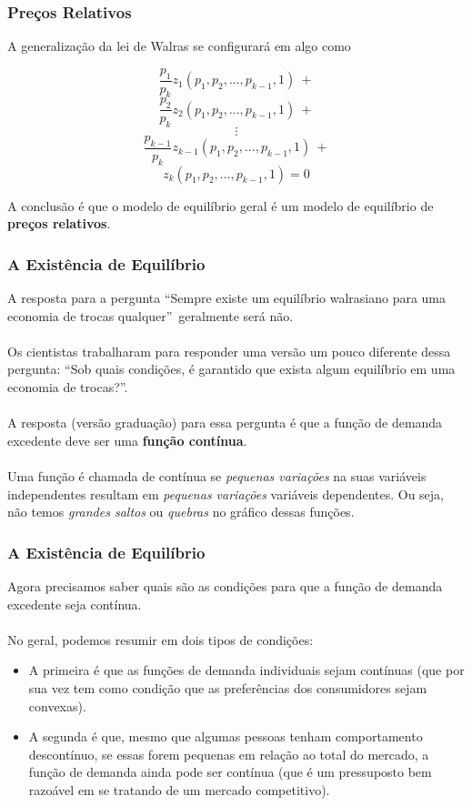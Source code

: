 \documentclass{beamer}[10]
\begin{document}
\begin{frame}
	\frametitle{Preços Relativos}

	A generalização da lei de Walras se configurará em algo como

	$$\frac{p_1}{p_k}z_1(p_1,p_2,...,p_{k-1},1) \ + $$
	$$\frac{p_2}{p_k}z_2(p_1,p_2,...,p_{k-1},1) \ + $$ 
	$$ \vdots $$
	$$\frac{p_{k-1}}{p_k}z_{k - 1}(p_1,p_2,...,p_{k-1},1) \ + $$
	$$z_{k}(p_1,p_2,...,p_{k-1},1) = 0$$
		
	A conclusão é que o modelo de equilíbrio geral é um modelo de equilíbrio de \textbf{preços relativos}.
\end{frame}

\begin{frame}
	\frametitle{A Existência de Equilíbrio}

	A resposta para a pergunta ``Sempre existe um equilíbrio walrasiano para uma economia de trocas qualquer''\ geralmente será não. 
	\\~\\
	Os cientistas trabalharam para responder uma versão um pouco diferente dessa pergunta: ``Sob quais condições, é garantido que exista algum equilíbrio em uma economia de trocas?''.
	\\~\\
	A resposta (versão graduação) para essa pergunta é que a função de demanda excedente deve ser uma \textbf{função contínua}.
	\\~\\
	Uma função é chamada de contínua se \textit{pequenas variações} na suas variáveis independentes resultam em \textit{pequenas variações} variáveis dependentes. Ou seja, não temos \textit{grandes saltos} ou \textit{quebras} no gráfico dessas funções.

\end{frame}

\begin{frame}
	\frametitle{A Existência de Equilíbrio}

	Agora precisamos saber quais são as condições para que a função de demanda excedente seja contínua.
	\\~\\
	No geral, podemos resumir em dois tipos de condições:

	\begin{itemize}
		\item A primeira é que as funções de demanda individuais sejam contínuas (que por sua vez tem como condição que as preferências dos consumidores sejam convexas).
		\item A segunda é que, mesmo que algumas pessoas tenham comportamento descontínuo, se essas forem pequenas em relação ao total do mercado, a função de demanda ainda pode ser contínua (que é um pressuposto bem razoável em se tratando de um mercado competitivo).
	\end{itemize}

\end{frame}
\end{document}
